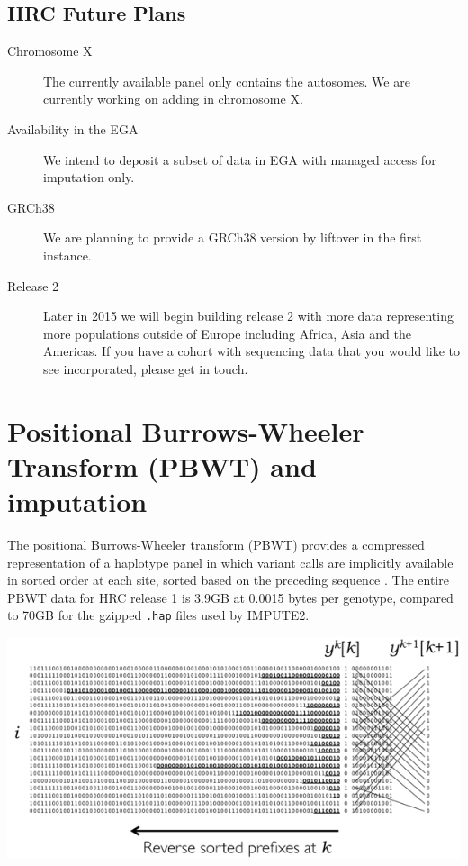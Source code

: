 \documentclass[a0,landscape]{a0poster}
\begin{document}
\begin{multicols}{3}
\subsection*{HRC Future Plans}

\begin{description}
\item[Chromosome X] The currently available panel only contains the autosomes. We are currently working on adding in chromosome X.
\item[Availability in the EGA] We intend to deposit a subset of data in EGA with managed access for imputation only.
\item[GRCh38] We are planning to provide a GRCh38 version by liftover in the first instance.
\item[Release 2] Later in 2015 we will begin building release 2 with more data representing more populations outside of Europe including Africa, Asia and the Americas. If you have a cohort with sequencing data that you would like to see incorporated, please get in touch.
\end{description}

\vfill
\columnbreak


\section*{Positional Burrows-Wheeler Transform (PBWT) and imputation}

The positional Burrows-Wheeler transform (PBWT) provides a compressed representation of a haplotype panel in which variant calls are implicitly available in sorted order at each site, sorted based on the preceding sequence \cite{durbin2014efficient}. The entire PBWT data for HRC release 1 is 3.9GB at 0.0015 bytes per genotype, compared to 70GB for the gzipped \texttt{.hap} files used by IMPUTE2.  

\begin{center}\vspace{0.001cm}
\captionsetup{type=figure}
\includegraphics[width=0.7\linewidth]{images/pbwt2.png}
\end{center}\vspace{0.001cm}


\end{multicols}
\end{document}
